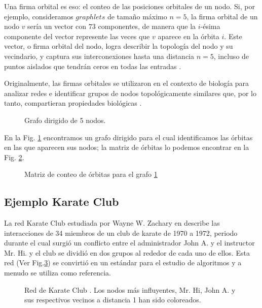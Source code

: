 Una firma orbital es eso: el conteo de las posiciones orbitales de un nodo. Si, por ejemplo, consideramos $graphlets$ de tamaño máximo $n=5$, la firma orbital de un nodo $v$ sería un vector con $73$ componentes, de manera que la $i$-ésima componente del vector represente las veces que $v$ aparece en la órbita $i$. Este vector, o firma orbital del nodo, logra describir la topología del nodo y su vecindario, y captura sus interconexiones hasta una distancia $n=5$, incluso de puntos aislados que tendrán ceros en todas las entradas \cite{sarajlic_graphlet-based_2016}.

Originalmente, las firmas orbitales se utilizaron en el contexto de biología para analizar redes e identificar grupos de nodos topológicamente similares que, por lo tanto, compartieran propiedades biológicas \cite{milenkovic_uncovering_2008}. 

 \begin{figure}[htbp]
  \centering
  
    \caption{Grafo dirigido de 5 nodos.}
    \label{fig:examplecount}
\end{figure}

En la Fig. \ref{fig:examplecount} encontramos un grafo dirigido para el cual identificamos las órbitas en las que aparecen sus nodos; la matriz de órbitas lo podemos encontrar en la Fig. \ref{fig:examplecount-vector}.

 \begin{figure}[htbp]
  \centering
  
    \caption{Matriz de conteo de órbitas para el grafo \ref{fig:examplecount}}
    \label{fig:examplecount-vector}
\end{figure}

\subsection{Ejemplo Karate Club}
La red Karate Club estudiada por Wayne W. Zachary en  \cite{zachary_information_1977} describe las interacciones de 34 miembros de un club de karate de 1970 a 1972, periodo durante el cual surgió un conflicto entre el administrador John A. y el instructor Mr. Hi. y el club se dividió en dos grupos al rededor de cada uno de ellos. Esta red (Ver Fig.\ref{fig:karateclub}) se convirtió en un estándar para el estudio de algoritmos y a menudo se utiliza como referencia. 

 \begin{figure}[htbp]
  \centering
  
    \caption{Red de Karate Club \cite{zachary_information_1977}. Los nodos más influyentes, Mr. Hi, John A. y sus respectivos vecinos a distancia 1 han sido coloreados.}
    \label{fig:karateclub}
\end{figure}

